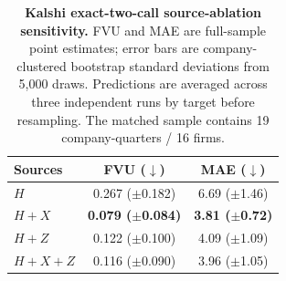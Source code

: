 \begin{table}[t]
\centering
\caption{\textbf{Kalshi exact-two-call source-ablation sensitivity.}
FVU and MAE are full-sample point estimates; error bars are company-clustered bootstrap
standard deviations from 5,000 draws. Predictions are averaged across three independent runs
by target before resampling. The matched sample contains 19 company-quarters / 16 firms.}
\label{tab:kalshi_ablation_exact_two_call}
\setlength{\tabcolsep}{15pt}
\begin{tabular}{lcc}
\toprule
Sources & FVU ($\downarrow$) & MAE ($\downarrow$) \\
\midrule
\quad $H$ & 0.267 {\footnotesize($\pm$0.182)} & 6.69 {\footnotesize($\pm$1.46)} \\
\quad $H+X$ & \textbf{0.079 {\footnotesize($\pm$0.084)}} & \textbf{3.81 {\footnotesize($\pm$0.72)}} \\
\quad $H+Z$ & 0.122 {\footnotesize($\pm$0.100)} & 4.09 {\footnotesize($\pm$1.09)} \\
\quad $H+X+Z$ & 0.116 {\footnotesize($\pm$0.090)} & 3.96 {\footnotesize($\pm$1.05)} \\
\bottomrule
\end{tabular}
\end{table}
